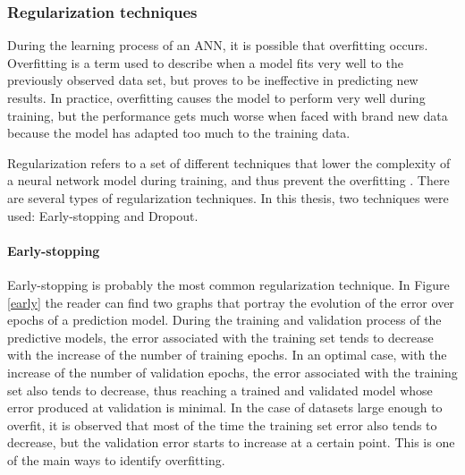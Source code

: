 \subsubsection{Regularization techniques}\label{chap3:subsubsec:regularization_techniques}

During the learning process of an \ac{ANN}, it is possible that overfitting occurs. Overfitting is a term used to describe when a model fits very well to the previously observed data set, but proves to be ineffective in predicting new results. In practice, overfitting causes the model to perform very well during training, but the performance gets much worse when faced with brand new data because the model has adapted too much to the training data.  

Regularization refers to a set of different techniques that lower the complexity of a neural network model during training, and thus prevent the overfitting \cite{reg0}. There are several types of regularization techniques. In this thesis, two techniques were used: Early-stopping and Dropout.

\paragraph{Early-stopping}\label{sec:early}

Early-stopping is probably the most common regularization technique. In Figure \ref{early} the reader can find two graphs that portray the evolution of the error over epochs of a prediction model. During the training and validation process of the predictive models, the error associated with the training set tends to decrease with the increase of the number of training epochs. In an optimal case, with the increase of the number of validation epochs, the error associated with the training set also tends to decrease, thus reaching a trained and validated model whose error produced at validation is minimal. In the case of datasets large enough to overfit, it is observed that most of the time the training set error also tends to decrease, but the validation error starts to increase at a certain point. This is one of the main ways to identify overfitting.

